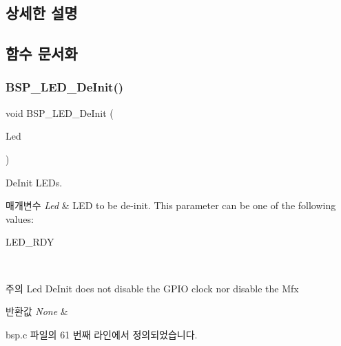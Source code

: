 \subsection{상세한 설명}


\subsection{함수 문서화}
\mbox{\label{group___lory_s_d_k___l_e_d___functions_ga8cb1d5b32557d492b8bf0f7109bd6d3f}} 
\subsubsection{\texorpdfstring{B\+S\+P\+\_\+\+L\+E\+D\+\_\+\+De\+Init()}{BSP\_LED\_DeInit()}}
{\footnotesize\ttfamily void B\+S\+P\+\_\+\+L\+E\+D\+\_\+\+De\+Init (\begin{DoxyParamCaption}\item[{\mbox{\hyperlink{_lory_s_d_k__hw__conf_8h_aa059704b7ca945eb9c1e7f2c3d03fecd}{Led\+\_\+\+Type\+Def}}}]{Led }\end{DoxyParamCaption})}



De\+Init L\+E\+Ds. 


\begin{DoxyParams}{매개변수}
{\em Led} & L\+ED to be de-\/init. This parameter can be one of the following values\+: \begin{DoxyItemize}
\item L\+E\+D\+\_\+\+R\+DY \end{DoxyItemize}
\\
\hline
\end{DoxyParams}
\begin{DoxyNote}{주의}
Led De\+Init does not disable the G\+P\+IO clock nor disable the Mfx 
\end{DoxyNote}

\begin{DoxyRetVals}{반환값}
{\em None} & \\
\hline
\end{DoxyRetVals}


bsp.\+c 파일의 61 번째 라인에서 정의되었습니다.


